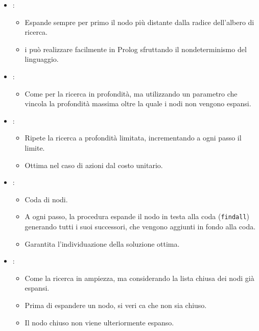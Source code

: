 \begin{itemize}
  \item {}: 
    \begin{itemize}
      \item Espande sempre per primo il nodo più distante dalla radice
dell’albero di ricerca. 
\item i può realizzare facilmente in Prolog sfruttando il
nondeterminismo del linguaggio. 
    \end{itemize}
  \item {}:
    \begin{itemize}
      \item Come per la ricerca in profondità, ma utilizzando un parametro
che vincola la profondità massima oltre la quale i nodi non
vengono espansi.
    \end{itemize}
  \item {}: 
    \begin{itemize}
      \item Ripete la ricerca a profondità limitata, incrementando a ogni
passo il limite. 
\item Ottima nel caso di azioni dal costo unitario.
    \end{itemize}
  \item {}: 
    \begin{itemize}
      \item Coda di nodi. 
      \item A ogni passo, la procedura espande il nodo in testa
        alla coda (\texttt{findall}) generando tutti i suoi successori,
che vengono aggiunti in fondo alla coda. 
\item Garantita l’individuazione della soluzione ottima.
    \end{itemize}
  \item {}:
    \begin{itemize}
      \item Come la ricerca in ampiezza, ma considerando la lista
chiusa dei nodi già espansi. 
\item Prima di espandere un nodo, si veri ca che non
sia chiuso. 
\item Il nodo chiuso non viene ulteriormente espanso.
    \end{itemize}
\end{itemize}


